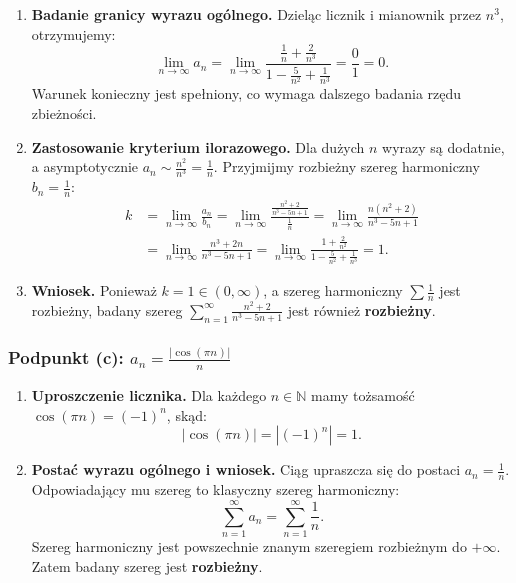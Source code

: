 \begin{enumerate}[label=\textbf{Krok \arabic*.},leftmargin=*]
    \item \textbf{Badanie granicy wyrazu ogólnego.}
    Dzieląc licznik i mianownik przez $n^3$, otrzymujemy:
    \begin{equation*}
        \lim_{n \to \infty} a_n = \lim_{n \to \infty} \frac{\frac{1}{n} + \frac{2}{n^3}}{1 - \frac{5}{n^2} + \frac{1}{n^3}} = \frac{0}{1} = 0.
    \end{equation*}
    Warunek konieczny jest spełniony, co wymaga dalszego badania rzędu zbieżności.
    \item \textbf{Zastosowanie kryterium ilorazowego.}
    Dla dużych $n$ wyrazy są dodatnie, a asymptotycznie $a_n \sim \frac{n^2}{n^3} = \frac{1}{n}$. Przyjmijmy rozbieżny szereg harmoniczny $b_n = \frac{1}{n}$:
    \begin{align*}
        k &= \lim_{n \to \infty} \frac{a_n}{b_n} = \lim_{n \to \infty} \frac{\frac{n^2+2}{n^3-5n+1}}{\frac{1}{n}} = \lim_{n \to \infty} \frac{n(n^2+2)}{n^3-5n+1} \\
        &= \lim_{n \to \infty} \frac{n^3+2n}{n^3-5n+1} = \lim_{n \to \infty} \frac{1 + \frac{2}{n^2}}{1 - \frac{5}{n^2} + \frac{1}{n^3}} = 1.
    \end{align*}
    \item \textbf{Wniosek.}
    Ponieważ $k = 1 \in (0, \infty)$, a szereg harmoniczny $\sum \frac{1}{n}$ jest rozbieżny, badany szereg $\displaystyle\sum_{n=1}^{\infty} \frac{n^2+2}{n^3-5n+1}$ jest również \textbf{rozbieżny}.
\end{enumerate}

\subsubsection*{Podpunkt (c): $\displaystyle a_n = \frac{|\cos(\pi n)|}{n}$}

\begin{enumerate}[label=\textbf{Krok \arabic*.},leftmargin=*]
    \item \textbf{Uproszczenie licznika.}
    Dla każdego $n \in \mathbb{N}$ mamy tożsamość $\cos(\pi n) = (-1)^n$, skąd:
    \begin{equation*}
        |\cos(\pi n)| = |(-1)^n| = 1.
    \end{equation*}
    \item \textbf{Postać wyrazu ogólnego i wniosek.}
    Ciąg upraszcza się do postaci $a_n = \frac{1}{n}$. Odpowiadający mu szereg to klasyczny szereg harmoniczny:
    \begin{equation*}
        \sum_{n=1}^{\infty} a_n = \sum_{n=1}^{\infty} \frac{1}{n}.
    \end{equation*}
    Szereg harmoniczny jest powszechnie znanym szeregiem rozbieżnym do $+\infty$. Zatem badany szereg jest \textbf{rozbieżny}.
\end{enumerate}

